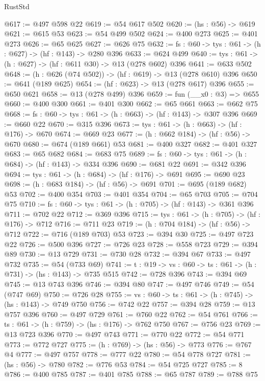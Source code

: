 \begin{lexlean}{RustStd}
\begin{coremodule}
{\begin{coremodule}
{{{{{{{{{{{{{{{{{{{{{{@617 := @497 @598 @22
@619 := @54 @617 @502
@620 := (hs : @56) -> @619
@621 := @615 @53
@623 := @54 @499 @502
@624 := @400 @273
@625 := @401 @273
@626 := @65 @625
@627 := @626 @75
@632 := {fs : @60} -> {tys : @61} -> (h : @627) -> (hf : @143) -> @280 @396
@633 := @624 @499
@640 := {tys : @61} -> (h : @627) -> (hf : @611 @30) -> @13 (@278 @602) @396
@641 := @633 @502
@648 := (h : @626 (@74 @502)) -> (hf : @619) -> @13 (@278 @610) @396
@650 := @641 (@189 @625)
@654 := (hf : @623) -> @13 (@278 @617) @396
@655 := @650 @621
@658 := @13 (@278 @499) @396
@659 := fun (__x0 : @3) => @655
@660 := @400 @300
@661 := @401 @300
@662 := @65 @661
@663 := @662 @75
@668 := {fs : @60} -> {tys : @61} -> (h : @663) -> (hf : @143) -> @307 @396
@669 := @660 @22
@670 := @315 @396
@673 := {tys : @61} -> (h : @663) -> (hf : @176) -> @670
@674 := @669 @23
@677 := (h : @662 @184) -> (hf : @56) -> @670
@680 := @674 (@189 @661) @53
@681 := @400 @327
@682 := @401 @327
@683 := @65 @682
@684 := @683 @75
@689 := {fs : @60} -> {tys : @61} -> (h : @684) -> (hf : @143) -> @334 @396
@690 := @681 @22
@691 := @342 @396
@694 := {tys : @61} -> (h : @684) -> (hf : @176) -> @691
@695 := @690 @23
@698 := (h : @683 @184) -> (hf : @56) -> @691
@701 := @695 (@189 @682) @53
@702 := @400 @354
@703 := @401 @354
@704 := @65 @703
@705 := @704 @75
@710 := {fs : @60} -> {tys : @61} -> (h : @705) -> (hf : @143) -> @361 @396
@711 := @702 @22
@712 := @369 @396
@715 := {tys : @61} -> (h : @705) -> (hf : @176) -> @712
@716 := @711 @23
@719 := (h : @704 @184) -> (hf : @56) -> @712
@722 := @716 (@189 @703) @53
@723 := @394 @30
@725 := @497 @723 @22
@726 := @500 @396
@727 := @726 @23
@728 := @558 @723
@729 := @394 @89
@730 := @13 @729
@731 := @730 @28
@732 := @394 @67
@733 := @497 @732
@735 := @54 (@733 @69)
@741 := {t : @19} -> {vs : @60} -> {ts : @61} -> (h : @731) -> (hs : @143) -> @735 @515
@742 := @728 @396
@743 := @394 @69
@745 := @13 @743 @396
@746 := @394 @80
@747 := @497 @746
@749 := @54 (@747 @69)
@750 := @726 @28
@755 := {vs : @60} -> {ts : @61} -> (h : @745) -> (hs : @143) -> @749 @750
@756 := @742 @22
@757 := @394 @28
@759 := @13 @757 @396
@760 := @497 @729
@761 := @760 @22
@762 := @54 @761
@766 := {ts : @61} -> (h : @759) -> (hs : @176) -> @762 @750
@767 := @756 @23
@769 := @13 @723 @396
@770 := @497 @743
@771 := @770 @22
@772 := @54 @771
@773 := @772 @727
@775 := (h : @769) -> (hs : @56) -> @773
@776 := @767 @4
@777 := @497 @757
@778 := @777 @22
@780 := @54 @778 @727
@781 := (hs : @56) -> @780
@782 := @776 @53
@784 := @54 @725 @727
@785 := 8
@786 := @400 @785
@787 := @401 @785
@788 := @65 @787
@789 := @788 @75
}}}}}}}}}}}}}}}}}}}}}}
\end{coremodule}}
\end{coremodule}
\end{lexlean}
